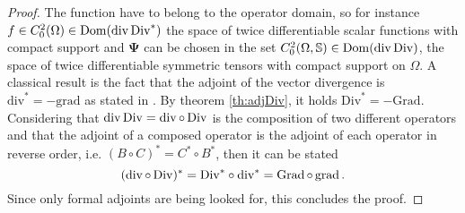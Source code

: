 \begin{theorem}
\begin{proof}
		
		The function have to belong to the operator domain, so for instance $f \in {C}_0^2(\Omega) \in \operatorname{Dom}({\operatorname{div}\operatorname*{Div}}^*)$ the space of twice differentiable scalar functions with compact support and $\bm{\Psi}$ can be chosen in the set ${C}_{0}^2(\Omega, \mathbb{S}) \in \operatorname{Dom}(\operatorname{div}\operatorname*{Div})$, the space of twice differentiable symmetric tensors with compact support on $\Omega$. A classical result is the fact that the adjoint of the vector divergence is $\mathrm{div}^* = -\mathrm{grad}$ as stated in \cite{zwart2015wave}. By theorem \ref{th:adjDiv}, it holds $\mathrm{Div}^* = -\mathrm{Grad}$. Considering that $\operatorname{div}\operatorname*{Div} = \operatorname{div} \circ \operatorname*{Div}$ is the composition of two different operators and that the adjoint of a composed operator is the adjoint of each operator in reverse order, i.e. $(B \circ C)^* = C^* \circ B^*$, then it can be stated
		\begin{equation*}
		(\operatorname{div} \circ \operatorname*{Div})^* = {\operatorname*{Div}}^* \circ {\operatorname{div}}^* = \operatorname*{Grad} \circ \operatorname*{grad}.
		\end{equation*}  
		Since only formal adjoints are being looked for, this concludes the proof.
	\end{proof}
\end{theorem}

